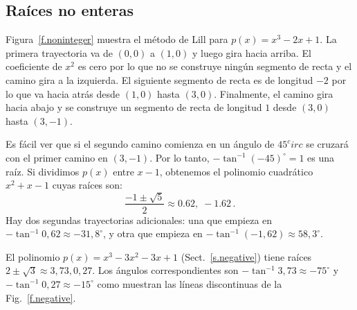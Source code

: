 \subsection{Raíces no enteras}\label{s.noninteger}
Figura~\ref{f.noninteger} muestra el método de Lill para $p(x)=x^3-2x+1$. La primera trayectoria va de $(0,0)$ a $(1,0)$ y luego gira hacia arriba. El coeficiente de $x^2$ es cero por lo que no se construye ningún segmento de recta y el camino gira a la izquierda. El siguiente segmento de recta es de longitud $-2$ por lo que va hacia atrás desde $(1,0)$ hasta $(3,0)$. Finalmente, el camino gira hacia abajo y se construye un segmento de recta de longitud $1$ desde $(3,0)$ hasta $(3,-1)$.

Es fácil ver que si el segundo camino comienza en un ángulo de $ 45^circ $ se cruzará con el primer camino en $ (3,-1) $. Por lo tanto, $-\tan^{-1} (-45)^\circ=1$ es una raíz. Si dividimos $p(x)$ entre $x-1$, obtenemos el polinomio cuadrático $x^2+x-1$ cuyas raíces son:
\[
\frac{-1\pm\sqrt{5}}{2} \approx 0.62,\; -1.62\,.
\]
Hay dos segundas trayectorias adicionales: una que empieza en $-\tan^{-1} 0,62\approx -31,8^\circ$, y otra que empieza en $-\tan^{-1}(-1,62)\approx 58,3^\circ$.

El polinomio $p(x)=x^3-3x^2-3x+1$ (Sect.~\ref{s.negative}) tiene raíces $ 2\pm\sqrt{3}\approx 3,73, 0,27$. Los ángulos correspondientes son $-\tan^{-1} 3,73 \approx -75^\circ$ y $-\tan^{-1} 0,27 \approx -15^\circ$ como muestran las líneas discontinuas de la Fig.~\ref{f.negative}.


